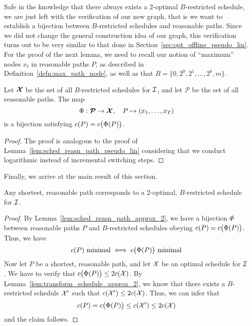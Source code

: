 Safe in the knowledge that there always exists a 2-optimal $B$-restricted schedule, we are just left with the verification of our new graph, that is we want to establish a bijection between $B$-restricted schedules and reasonable paths. Since we did not change the general construction idea of our graph, this verification turns out to be very similar to that done in Section~\ref{sec:opt_offline_pseudo_lin}. For the proof of the next lemma, we need to recall our notion of ``maximum'' nodes $x_t$ in reasonable paths $P$, as described in Definition~\ref{defn:max_path_node}, as well as that $B=\{0,2^0,2^1,\dotsc,2^b,m\}$. 
\begin{lem}\label{lem:sched_reasn_path_approx_2}
Let $\bm{\mathcal{X}}$ be the set of all $B$-restricted schedules for $\mathcal{I}$, and let $\bm{\mathcal{P}}$ be the set of all reasonable paths. The map
\begin{equation*}
	\Phi:\bm{\mathcal{P}}\rightarrow\bm{\mathcal{X}},\quad P\mapsto (x_1,\dotsc,x_T)
\end{equation*}
is a bijection satisfying $c(P)=c\bigl(\Phi(P)\bigr)$.
\end{lem}
\begin{proof}
The proof is analogous to the proof of Lemma~\ref{lem:sched_reasn_path_pseudo_lin} considering that we conduct logarithmic instead of incremental switching steps.
\end{proof}
Finally, we arrive at the main result of this section.
\begin{thm}\label{thm:approx_2}
Any shortest, reasonable path corresponds to a 2-optimal, $B$-restricted schedule for $\mathcal{I}$.
\end{thm} 
\begin{proof}
By Lemma~\ref{lem:sched_reasn_path_approx_2}, we have a bijection $\Phi$ between reasonable paths $P$ and $B$-restricted schedules obeying $c(P)=c\bigl(\Phi(P)\bigr)$. Thus, we have 
\begin{equation*}
	c(P)\text{ minimal}\iff c\bigl(\Phi(P)\big)\text{ minimal}
\end{equation*}
Now let $P$ be a shortest, reasonable path, and let $\mathcal{X}$ be an optimal schedule for $\mathcal{I}$. We have to verify that $c\bigl(\Phi(P)\bigr)\le 2c(\mathcal{X})$. By Lemma~\ref{lem:transform_schedule_approx_2}, we know that there exists a $B$-restricted schedule $\mathcal{X}'$ such that $c(\mathcal{X}')\le 2c(\mathcal{X})$. Thus, we can infer that
\begin{equation*}
	c(P)=c\bigl(\Phi(P)\bigr)\le c(\mathcal{X}')\le 2c(\mathcal{X})
\end{equation*}
and the claim follows.
\end{proof}
